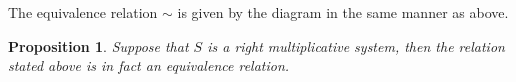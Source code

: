 \documentclass[11pt]{article}
\newtheorem{prop}[theorem]{Proposition}
\theoremstyle{definition}
\theoremstyle{remark}
\begin{document}
            The equivalence relation $\sim$ is given by the diagram in the same manner as above.
            \begin{center}
            \end{center}

            \begin{prop}
                Suppose that $S$ is a right multiplicative system, then the relation stated above is in fact an equivalence relation.
            \end{prop}
\end{document}
